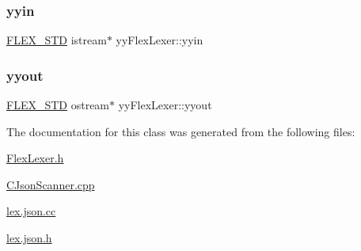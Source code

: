 \mbox{\label{classyyFlexLexer_a5be30a2c4ed9973f0ede10322ca9dbe8}} 
\subsubsection{\texorpdfstring{yyin}{yyin}}
{\footnotesize\ttfamily \hyperlink{FlexLexer_8h_ae50ff830f34b9e244163babb41a1552d}{F\+L\+E\+X\+\_\+\+S\+TD} istream$\ast$ yy\+Flex\+Lexer\+::yyin\hspace{0.3cm}{\ttfamily [protected]}}

\mbox{\label{classyyFlexLexer_ac78543eed2c5f96cb6e4256450f0a923}} 
\subsubsection{\texorpdfstring{yyout}{yyout}}
{\footnotesize\ttfamily \hyperlink{FlexLexer_8h_ae50ff830f34b9e244163babb41a1552d}{F\+L\+E\+X\+\_\+\+S\+TD} ostream$\ast$ yy\+Flex\+Lexer\+::yyout\hspace{0.3cm}{\ttfamily [protected]}}



The documentation for this class was generated from the following files\+:\begin{DoxyCompactItemize}
\item 
\hyperlink{FlexLexer_8h}{Flex\+Lexer.\+h}\item 
\hyperlink{CJsonScanner_8cpp}{C\+Json\+Scanner.\+cpp}\item 
\hyperlink{lex_8json_8cc}{lex.\+json.\+cc}\item 
\hyperlink{lex_8json_8h}{lex.\+json.\+h}\end{DoxyCompactItemize}
